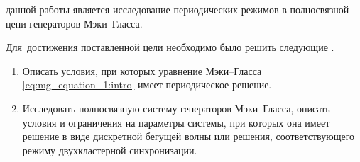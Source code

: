 


{\aim} данной работы является исследование периодических режимов в полносвязной цепи генераторов Мэки--Гласса.

Для~достижения поставленной цели необходимо было решить следующие {\tasks}.
\begin{enumerate}[beginpenalty=10000] %
	\item Описать условия, при которых уравнение Мэки--Гласса \eqref{eq:mg_equation_1:intro} имеет периодическое решение.
	\item Исследовать полносвязную систему генераторов Мэки--Гласса, описать условия и ограничения на параметры системы, при которых она имеет решение в виде дискретной бегущей волны или решения, соответствующего режиму двухкластерной синхронизации.
\end{enumerate}


